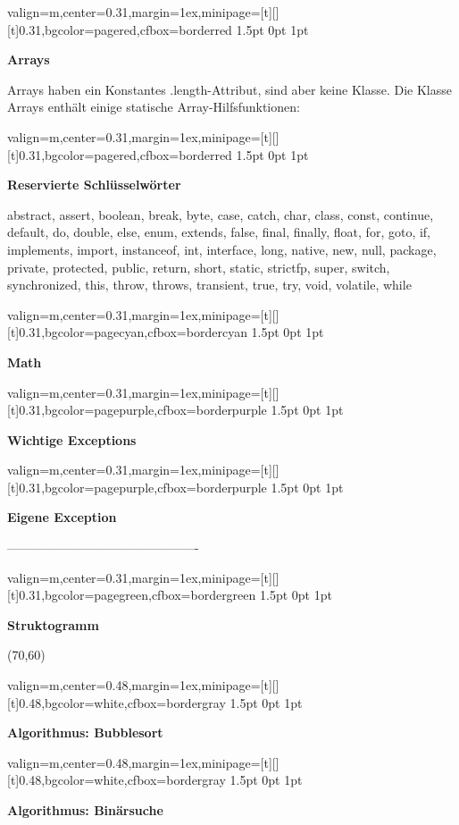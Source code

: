 \documentclass[11pt, a4paper, landscape]{article}
\newcommand{\fancyheader}[1]{
	\centerline{\sffamily \textbf{ \large #1}}
}
\newenvironment{fancybox}[2]
{
	\begin{adjustbox}{valign=m,center=0.31\textwidth,margin=1ex,minipage=[t][][t]{0.31\textwidth},bgcolor=#1,cfbox=#2 1.5pt 0pt 1pt}
	\begin{centering}
}
{
	\end{centering}
	\end{adjustbox}
}
\newenvironment{fancyboxwide}[2]
{
	\begin{adjustbox}{valign=m,center=0.48\textwidth,margin=1ex,minipage=[t][][t]{0.48\textwidth},bgcolor=#1,cfbox=#2 1.5pt 0pt 1pt}
	\begin{centering}
}
{
	\end{centering}
	\end{adjustbox}
}
\begin{document}
\begin{multicols}{3}
\begin{fancybox}{pagered}{borderred}
\fancyheader{Arrays}
\raggedright {
	Arrays haben ein Konstantes {\ttfamily .length}-Attribut, sind aber keine Klasse. Die Klasse {\ttfamily Arrays} enthält einige statische Array-Hilfsfunktionen:
}

\end{fancybox}

\begin{fancybox}{pagered}{borderred}
\fancyheader{Reservierte Schlüsselwörter}
{\ttfamily abstract, assert, boolean, break, byte, case, catch, char, class, const, continue, default, do, double, else, enum, extends, false, final, finally, float, for, goto, if, implements, import, instanceof, int, interface, long, native, new, null, package, private, protected, public, return, short, static, strictfp, super, switch, synchronized, this, throw, throws, transient, true, try, void, volatile, while}
\end{fancybox}

\begin{fancybox}{pagecyan}{bordercyan}
\fancyheader{Math}

\end{fancybox}

\begin{fancybox}{pagepurple}{borderpurple}
\fancyheader{Wichtige Exceptions}

\end{fancybox}

\begin{fancybox}{pagepurple}{borderpurple}
\fancyheader{Eigene Exception}

----------------------------------------------

\end{fancybox}

\begin{fancybox}{pagegreen}{bordergreen}
\fancyheader{Struktogramm}

\begin{struktogramm}(70,60)
			\change
		\ifend
		\change
	\ifend
\end{struktogramm}
\end{fancybox}

\end{multicols}

\newpage

\begin{fancyboxwide}{white}{bordergray}
\fancyheader{Algorithmus: Bubblesort}

\end{fancyboxwide}

\begin{multicols}{2}
\begin{fancyboxwide}{white}{bordergray}
\fancyheader{Algorithmus: Binärsuche}

\end{fancyboxwide}
\end{multicols}
\end{document}
